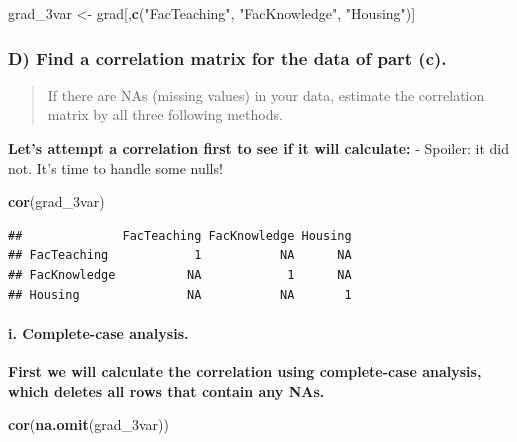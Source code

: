 \documentclass[
]{article}
\newenvironment{Shaded}{\begin{snugshade}}{\end{snugshade}}
\newcommand{\KeywordTok}[1]{\textcolor[rgb]{0.13,0.29,0.53}{\textbf{#1}}}
\newcommand{\NormalTok}[1]{#1}
\newcommand{\StringTok}[1]{\textcolor[rgb]{0.31,0.60,0.02}{#1}}
\begin{document}
\begin{Shaded}
\begin{Highlighting}[]
\NormalTok{grad_3var <-}\StringTok{ }\NormalTok{grad[,}\KeywordTok{c}\NormalTok{(}\StringTok{"FacTeaching"}\NormalTok{, }\StringTok{"FacKnowledge"}\NormalTok{, }\StringTok{"Housing"}\NormalTok{)]}
\end{Highlighting}
\end{Shaded}

\hypertarget{d-find-a-correlation-matrix-for-the-data-of-part-c.}{%
\subsubsection{D) Find a correlation matrix for the data of part
(c).}\label{d-find-a-correlation-matrix-for-the-data-of-part-c.}}

\begin{quote}
If there are NAs (missing values) in your data, estimate the correlation
matrix by all three following methods.
\end{quote}

\textbf{Let's attempt a correlation first to see if it will calculate:}
- Spoiler: it did not. It's time to handle some nulls!

\begin{Shaded}
\begin{Highlighting}[]
\KeywordTok{cor}\NormalTok{(grad_3var)}
\end{Highlighting}
\end{Shaded}

\begin{verbatim}
##              FacTeaching FacKnowledge Housing
## FacTeaching            1           NA      NA
## FacKnowledge          NA            1      NA
## Housing               NA           NA       1
\end{verbatim}

\hypertarget{i.-complete-case-analysis.}{%
\paragraph{i. Complete-case
analysis.}\label{i.-complete-case-analysis.}}

\textbf{First we will calculate the correlation using complete-case
analysis, which deletes all rows that contain any NAs.}

\begin{Shaded}
\begin{Highlighting}[]
\KeywordTok{cor}\NormalTok{(}\KeywordTok{na.omit}\NormalTok{(grad_3var))}
\end{Highlighting}
\end{Shaded}
\end{document}

